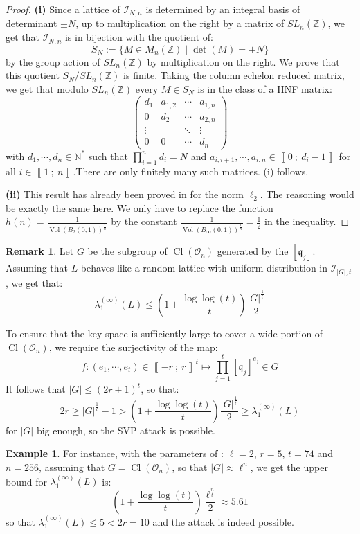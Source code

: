 \documentclass[a4paper,10pt]{report}
\theoremstyle{definition}
\theoremstyle{plain}
\theoremstyle{definition}
\newtheorem{remark}[definition]{Remark}
\newtheorem{example}[definition]{Example}
\newcommand{\N}{\mathbb{N}}
\newcommand{\Z}{\mathbb{Z}}
\newcommand{\m}[1]{\mathcal{#1}}
\newcommand{\mO}{\mathcal{O}}
\renewcommand{\i}[2]{\left\llbracket #1~;~#2\right\rrbracket}
\renewcommand{\(}{\left(}
\renewcommand{\)}{\right)}
\newcommand{\mf}[1]{\mathfrak{#1}}
\DeclareMathOperator{\Cl}{Cl}
\DeclareMathOperator{\Vol}{Vol}
\begin{document}
\begin{proof}
\textbf{(i)} Since a lattice of $\m{I}_{N,n}$ is determined by an integral basis of determinant $\pm N$, up to multiplication on the right by a matrix of $SL_n(\Z)$, we get that $\m{I}_{N,n}$ is in bijection with the quotient of:
\[S_N:=\{M\in M_n(\Z)\mid \det(M)=\pm N\}\]
by the group action of $SL_n(\Z)$ by multiplication on the right.  We prove that this quotient $S_N/SL_n(\Z)$ is finite. Taking the column echelon reduced matrix, we get that modulo $SL_n(\Z)$ every $M\in S_N$ is in the class of a HNF matrix:
\[\(\begin{array}{cccc}
d_1 & a_{1,2} & \cdots & a_{1,n}\\
0 & d_2 & \cdots & a_{2,n}\\
\vdots &  & \ddots & \vdots\\
0 & 0 & \cdots & d_n
\end{array}\)\]
with $d_1, \cdots, d_n\in\N^*$ such that $\prod_{i=1}^n d_i=N$ and $a_{i,i+1}, \cdots, a_{i,n}\in\i{0}{d_i-1}$ for all $i\in\i{1}{n}$.There are only finitely many such matrices. (i) follows.

\textbf{(ii)} This result has already been proved in \cite[theorem 11]{Aono} for the norm $\ell_2$. The reasoning would be exactly the same here. We only have to replace the function $h(n)=\frac{1}{\Vol(B_2(0,1))^{\frac{1}{n}}}$ by the constant $\frac{1}{\Vol(B_\infty(0,1))^{\frac{1}{n}}}=\frac{1}{2}$ in the inequality.
\end{proof}

\begin{remark}
Let $G$ be the subgroup of $\Cl(\mO_n)$ generated by the $[\mf{q}_j]$. Assuming that $L$ behaves like a random lattice with uniform distribution in $\m{I}_{|G|,t}$, we get that:
\[\lambda_1^{(\infty)}(L)\leq \(1+\frac{\log\log(t)}{t}\)\frac{|G|^{\frac{1}{t}}}{2}\] 

To ensure that the key space is sufficiently large to cover a wide portion of $\Cl(\mO_n)$, we require the surjectivity of the map:
\[f:(e_1,\cdots, e_t)\in\i{-r}{r}^t\longmapsto \prod_{j=1}^t[\mf{q}_j]^{e_j}\in G\]
It follows that $|G|\leq (2r+1)^t$, so that:
\[2r\geq |G|^{\frac{1}{t}}-1>\(1+\frac{\log\log(t)}{t}\)\frac{|G|^{\frac{1}{t}}}{2}\geq \lambda_1^{(\infty)}(L)\]
for $|G|$ big enough, so the SVP attack is possible.
\end{remark}

\begin{example}
For instance, with the parameters of \cite[p. 28]{OSIDH}: $\ell=2$, $r=5$, $t=74$ and $n=256$, assuming that $G=\Cl(\mO_n)$, so that $|G|\approx\ell^n$, we get the upper bound for $\lambda_1^{(\infty)}(L)$ is:
\[\(1+\frac{\log\log(t)}{t}\)\frac{\ell^{\frac{n}{t}}}{2}\approx 5.61\]
so that $\lambda_1^{(\infty)}(L)\leq 5<2r=10$ and the attack is indeed possible.
\end{example}
\end{document}
